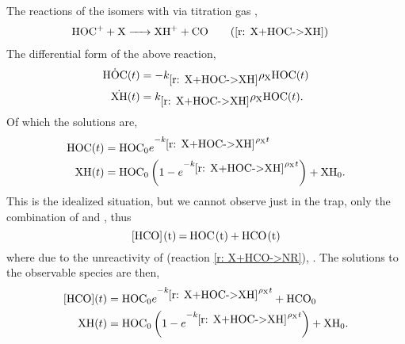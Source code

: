 The reactions of the isomers \ce{[HCO]+} with via titration gas ,
\begin{align*}
	\ce{HOC+ + X & -> XH+ + CO} \tag{\ref{r: X+HOC->XH}}
\end{align*}
The differential form of the above reaction,
\begin{align*}
	\dot{\ce{HOC}}(t) & = - k_{\ref{r: X+HOC->XH}} \rho_{\ce{X}} \ce{HOC}(t) \\
	\dot{\ce{XH}}(t) & = k_{\ref{r: X+HOC->XH}} \rho_{\ce{X}} \ce{HOC}(t).
\end{align*}
Of which the solutions are,
\begin{align*}
	\ce{HOC}(t) & = \ce{HOC0}e^{-k_{\ref{r: X+HOC->XH}} \rho_{\ce{X}} t} \\
	\ce{XH}(t) & = \ce{HOC0}\left(1-e^{-k_{\ref{r: X+HOC->XH}} \rho_{\ce{X}} t}\right) + \ce{XH0}.
\end{align*}
This is the idealized situation, but we cannot observe just  in the trap, only the combination of  and , thus
\begin{equation*}
	\ce{[HCO](t) = HOC(t) + HCO(t)}
\end{equation*}
where due to the unreactivity of  (reaction \ref{r: X+HCO->NR}), . The solutions to the observable species are then,
\begin{align}
	\ce{[HCO]}(t) & = \ce{HOC0}e^{-k_{\ref{r: X+HOC->XH}} \rho_{\ce{X}} t} + \ce{HCO0} \label{eq: X HOC(t)} \\
	\ce{XH}(t) & = \ce{HOC0}\left(1-e^{-k_{\ref{r: X+HOC->XH}} \rho_{\ce{X}} t}\right) + \ce{XH0}. \label{eq: X XH(t)}
\end{align}